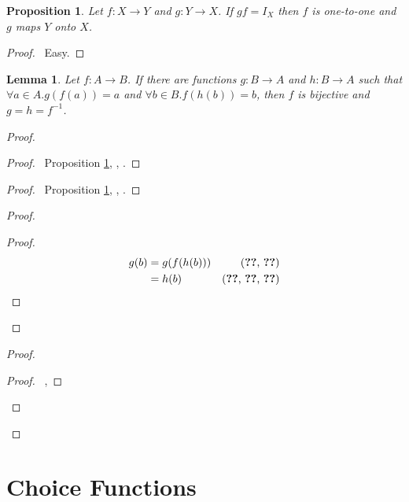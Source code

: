 \documentclass{report}
\let\qed\relax
\newtheorem{prop}[ax]{Proposition}
\newtheorem{lm}[ax]{Lemma}
\theoremstyle{definition}
\begin{document}
\begin{prop}
\label{prop:inverse_injective_surjective}
Let $f : X \rightarrow Y$ and $g : Y \rightarrow X$. If $gf = I_X$ then $f$ is one-to-one and $g$ maps $Y$ onto $X$.
\end{prop}

\begin{proof}
\pf\ Easy. \qed
\end{proof}

\begin{lm}
Let $f : A \rightarrow B$. If there are functions $g : B \rightarrow A$ and $h : B \rightarrow A$ such that $\forall a \in A. g(f(a)) = a$ and $\forall b \in B.f(h(b)) = b$, then $f$ is bijective and $g = h = f^{-1}$.
\end{lm}

\begin{proof}
\pf
{}
\begin{proof}
	\pf\ Proposition \ref{prop:inverse_injective_surjective}, , .
\end{proof}
\begin{proof}
	\pf\ Proposition \ref{prop:inverse_injective_surjective}, , .
\end{proof}
\begin{proof}
	\begin{proof}
		\pf
		\begin{align*}
			g(b) & = g(f(h(b))) & (\text{\stepref{4}, \stepref{a}}) \\
			& = h(b) & (\text{\stepref{3}, \stepref{2}, \stepref{a}})
		\end{align*}
	\end{proof}
\end{proof}
\begin{proof}
	\begin{proof}
		\pf\ , 
	\end{proof}
\end{proof}
\qed
\end{proof}

\section{Choice Functions}
\end{document}

